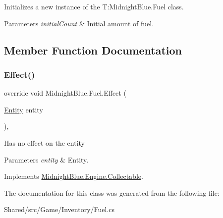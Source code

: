 Initializes a new instance of the T\+:\+Midnight\+Blue.\+Fuel class. 


\begin{DoxyParams}{Parameters}
{\em initial\+Count} & Initial amount of fuel.\\
\hline
\end{DoxyParams}


\subsection{Member Function Documentation}
\hypertarget{class_midnight_blue_1_1_fuel_a9ab52c79211ec8cdcc9389f772615ac0}{}\label{class_midnight_blue_1_1_fuel_a9ab52c79211ec8cdcc9389f772615ac0} 
\subsubsection{\texorpdfstring{Effect()}{Effect()}}
{\footnotesize\ttfamily override void Midnight\+Blue.\+Fuel.\+Effect (\begin{DoxyParamCaption}\item[{\hyperlink{class_midnight_blue_1_1_engine_1_1_entity_component_1_1_entity}{Entity}}]{entity }\end{DoxyParamCaption})\hspace{0.3cm}{\ttfamily [inline]}, {\ttfamily [virtual]}}



Has no effect on the entity 


\begin{DoxyParams}{Parameters}
{\em entity} & Entity.\\
\hline
\end{DoxyParams}


Implements \hyperlink{class_midnight_blue_1_1_engine_1_1_collectable_a72a7783ba8fc1bb116193db38a465a6f}{Midnight\+Blue.\+Engine.\+Collectable}.



The documentation for this class was generated from the following file\+:\begin{DoxyCompactItemize}
\item 
Shared/src/\+Game/\+Inventory/Fuel.\+cs\end{DoxyCompactItemize}
